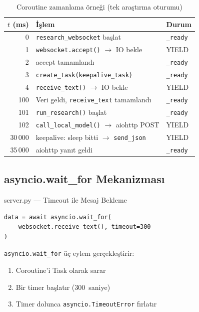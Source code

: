 \begin{table}[H]
\centering
\caption{Coroutine zamanlama \"{o}rne\u{g}i (tek ara\c{s}t{\i}rma oturumu)}
\label{tab:scheduling}
\begin{tabularx}{\textwidth}{rXl}
\toprule
\color{chapterBlue}\textbf{$t$ (ms)} & \color{chapterBlue}\textbf{\.{I}\c{s}lem} & \color{chapterBlue}\textbf{Durum} \\
\midrule
0        & \texttt{research\_websocket} ba\c{s}lat       & \texttt{\_ready} \\
1        & \texttt{websocket.accept()} $\to$ IO bekle  & YIELD \\
2        & accept tamamland{\i}                         & \texttt{\_ready} \\
3        & \texttt{create\_task(keepalive\_task)}       & \texttt{\_ready} \\
4        & \texttt{receive\_text()} $\to$ IO bekle      & YIELD \\
100      & Veri geldi, \texttt{receive\_text} tamamland{\i} & \texttt{\_ready} \\
101      & \texttt{run\_research()} ba\c{s}lat              & \texttt{\_ready} \\
102      & \texttt{call\_local\_model()} $\to$ aiohttp POST & YIELD \\
30\,000  & keepalive: sleep bitti $\to$ \texttt{send\_json} & YIELD \\
35\,000  & aiohttp yan{\i}t geldi                          & \texttt{\_ready} \\
\bottomrule
\end{tabularx}
\end{table}

\subsection{asyncio.wait\_for Mekanizmas{\i}}
\label{sec:wait-for}

\begin{kodref}{server.py --- Timeout ile Mesaj Bekleme}
\begin{lstlisting}
data = await asyncio.wait_for(
    websocket.receive_text(), timeout=300
)
\end{lstlisting}
\end{kodref}

\texttt{asyncio.wait\_for} \"{u}\c{c} eylem ger\c{c}ekle\c{s}tirir:
\begin{enumerate}
  \item Coroutine'i Task olarak sarar
  \item Bir timer ba\c{s}lat{\i}r (300~saniye)
  \item Timer dolunca \texttt{asyncio.TimeoutError} f{\i}rlat{\i}r
\end{enumerate}

